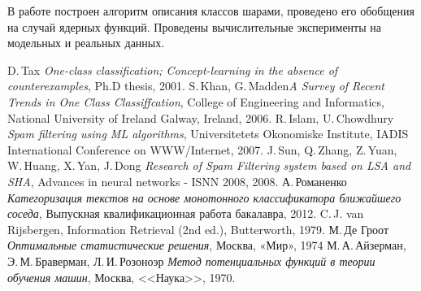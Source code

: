 \documentclass[12pt]{article}
\begin{document}
	В работе построен алгоритм описания классов шарами, проведено его обобщения на случай ядерных функций. Проведены вычислительные эксперименты на модельных и реальных данных.


\begin{thebibliography}{99}
	 D.\,Tax  \textit{One-class classification; Concept-learning in the absence of
	counterexamples}, Ph.D thesis, 2001.
	 S.\,Khan, G.\,Madden\textit{A Survey of Recent Trends in One Class
	Classiffcation}, College of Engineering and Informatics, National University of Ireland Galway,
	Ireland, 2006.
	 R.\,Islam, U.\,Chowdhury \textit{Spam filtering using ML algorithms}, Universitetets Okonomiske Institute, IADIS International Conference on WWW/Internet, 2007.
	 J.\,Sun, Q.\,Zhang, Z.\,Yuan, W.\,Huang, X.\,Yan, J.\,Dong \textit{Research of Spam Filtering system based on LSA and SHA}, Advances in neural networks - ISNN 2008, 2008.
	 А.\,Романенко  \textit{Категоризация текстов на основе монотонного
	классификатора ближайшего соседа}, Выпускная квалификационная работа бакалавра, 2012.
	 C.\,J. van Rijsbergen, Information Retrieval (2nd ed.), Butterworth, 1979.
	М.\,Де Гроот \textit{Оптимальные статистические решения}, Москва, «Мир», 1974
	 М.\,А.\,Айзерман, Э.\,М.\,Браверман, Л.\,И.\,Розоноэр \textit{Метод потенциальных функций в теории обучения машин}, Москва, <<Наука>>, 1970.
\end{thebibliography}
\end{document}
